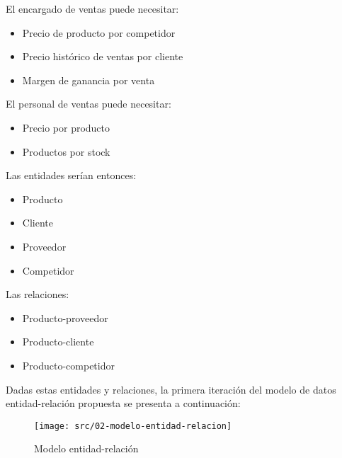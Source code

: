 \documentclass[11pt]{article}
\begin{document}
El encargado de ventas puede necesitar:
\begin{itemize}
	\item Precio de producto por competidor
	\item Precio histórico de ventas por cliente
	\item Margen de ganancia por venta
\end{itemize}

El personal de ventas puede necesitar:
\begin{itemize}
	\item Precio por producto
	\item Productos por stock 
\end{itemize}

Las entidades serían entonces:
\begin{itemize}
	\item Producto
	\item Cliente 
	\item Proveedor 
	\item Competidor 
\end{itemize}

Las relaciones:
\begin{itemize}
	\item Producto-proveedor 
	\item Producto-cliente 
	\item Producto-competidor 
\end{itemize}

Dadas estas entidades y relaciones,
la primera iteración del modelo de datos entidad-relación propuesta se presenta a continuación:

\begin{figure}[ht]
	\vspace{20pt}
	\centering
	\vspace{15pt}
	\texttt{[image: src/02-modelo-entidad-relacion]}
	\caption{Modelo entidad-relación}
	\vspace{15pt}
\end{figure}
\end{document}
